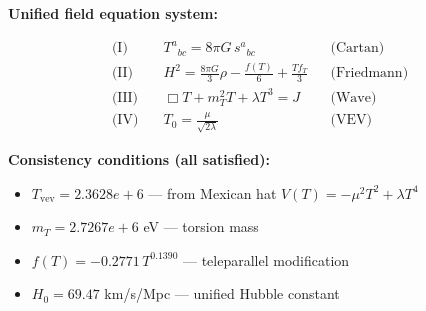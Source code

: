 
\textbf{Unified field equation system:}

\begin{align}
  \text{(I)} \quad & T^a{}_{bc} = 8\pi G \, s^a{}_{bc} && \text{(Cartan)} \\
  \text{(II)} \quad & H^2 = \frac{8\pi G}{3}\rho - \frac{f(T)}{6} + \frac{Tf_T}{3} && \text{(Friedmann)} \\
  \text{(III)} \quad & \Box T + m_T^2 T + \lambda T^3 = J && \text{(Wave)} \\
  \text{(IV)} \quad & T_0 = \frac{\mu}{\sqrt{2\lambda}} && \text{(VEV)}
\end{align}

\textbf{Consistency conditions (all satisfied):}
\begin{itemize}
  \item $T_{\text{vev}} = 2.3628e+6$ — from Mexican hat $V(T) = -\mu^2 T^2 + \lambda T^4$
  \item $m_T = 2.7267e+6$ eV — torsion mass
  \item $f(T) = -0.2771 \, T^{0.1390}$ — teleparallel modification
  \item $H_0 = 69.47$ km/s/Mpc — unified Hubble constant
\end{itemize}